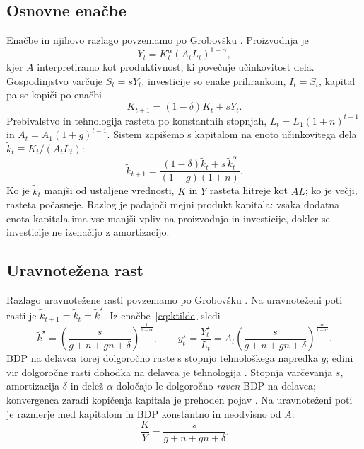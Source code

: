\documentclass[12pt,a4paper]{article}
\begin{document}
\subsection{Osnovne enačbe}\label{sec:enacbe}
Enačbe in njihovo razlago povzemamo po Grobovšku \parencite*[pros.~16--21, 31 in~52--57]{grobovsek2026}. Proizvodnja je
\begin{equation}\label{eq:prod}
Y_t=K_t^{\alpha}(A_tL_t)^{1-\alpha},
\end{equation}
kjer $A$ interpretiramo kot produktivnost, ki povečuje učinkovitost dela. Gospodinjstvo varčuje $S_t=sY_t$, investicije so enake prihrankom, $I_t=S_t$, kapital pa se kopiči po enačbi
\begin{equation}\label{eq:akum}
K_{t+1}=(1-\delta)K_t+sY_t .
\end{equation}
Prebivalstvo in tehnologija rasteta po konstantnih stopnjah, $L_t=L_1(1+n)^{t-1}$ in $A_t=A_1(1+g)^{t-1}$. Sistem zapišemo s kapitalom na enoto učinkovitega dela $\tilde k_t\equiv K_t/(A_tL_t)$:
\begin{equation}\label{eq:ktilde}
\tilde k_{t+1}=\frac{(1-\delta)\tilde k_t+s\,\tilde k_t^{\alpha}}{(1+g)(1+n)} .
\end{equation}
Ko je $\tilde k_t$ manjši od ustaljene vrednosti, $K$ in $Y$ rasteta hitreje kot $AL$; ko je večji, rasteta počasneje. Razlog je padajoči mejni produkt kapitala: vsaka dodatna enota kapitala ima vse manjši vpliv na proizvodnjo in investicije, dokler se investicije ne izenačijo z amortizacijo.

\subsection{Uravnotežena rast}\label{sec:bgp}
Razlago uravnotežene rasti povzemamo po Grobovšku \parencite*[pros.~55--61 in~77]{grobovsek2026}. Na uravnoteženi poti rasti je $\tilde k_{t+1}=\tilde k_t=\tilde k^{\star}$. Iz enačbe~\eqref{eq:ktilde} sledi
\begin{equation}\label{eq:bgp}
\tilde k^{\star}=\left(\frac{s}{g+n+gn+\delta}\right)^{\frac{1}{1-\alpha}},\qquad
y^{\star}_t=\frac{Y^{\star}_t}{L_t}=A_t\left(\frac{s}{g+n+gn+\delta}\right)^{\frac{\alpha}{1-\alpha}} .
\end{equation}
BDP na delavca torej dolgoročno raste s stopnjo tehnološkega napredka $g$; edini vir dolgoročne rasti dohodka na delavca je tehnologija \parencite[str.~13]{polanec_rast}. Stopnja varčevanja $s$, amortizacija $\delta$ in delež $\alpha$ določajo le dolgoročno \emph{raven} BDP na delavca; konvergenca zaradi kopičenja kapitala je prehoden pojav \parencite[str.~126--127]{garin2021}. Na uravnoteženi poti je razmerje med kapitalom in BDP konstantno in neodvisno od $A$:
\begin{equation}\label{eq:ky}
\frac{K}{Y}=\frac{s}{g+n+gn+\delta}.
\end{equation}
\end{document}
